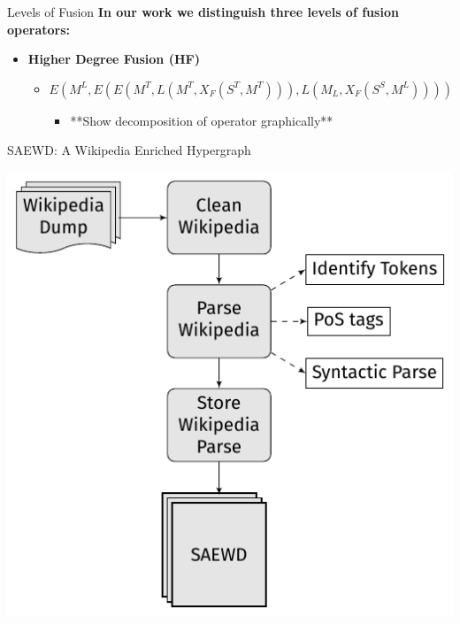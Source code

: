 \documentclass[10pt,xcolor=table]{beamer}
\begin{document}
\begin{frame}[t]{Levels of Fusion}
\large \textbf{In our work we distinguish three levels of fusion operators:} 
\vspace{.5cm}
\begin{itemize}
\item  \textbf{Higher Degree Fusion (HF)}
	\begin{itemize}
	\item $E(M^L , E(E(M^T , L(M^T , X_F (S^T , M^T ))) , L(M_L , X_F (S^S , M^L ))))$
		\begin{itemize}
			\item **Show decomposition of operator graphically**
			
		\end{itemize}
	\end{itemize}
\end{itemize}
\end{frame}



\begin{frame}{SAEWD: A Wikipedia Enriched Hypergraph}
\begin{center}
\includegraphics[width=.7\linewidth]{image2/Chapitre3/flow_chart.pdf}
\end{center}

 \vspace{\textheight}
\end{frame} 
\end{document}
